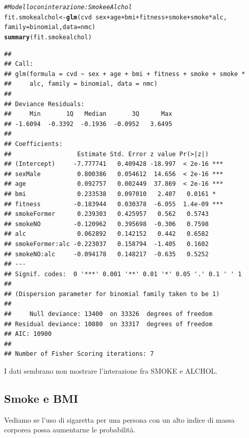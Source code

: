 \documentclass{article}\usepackage[]{graphicx}\usepackage[]{xcolor}
\makeatletter
\newcommand{\hlcom}[1]{\textcolor[rgb]{0.678,0.584,0.686}{\textit{#1}}}%
\newcommand{\hlopt}[1]{\textcolor[rgb]{0,0,0}{#1}}%
\newcommand{\hlstd}[1]{\textcolor[rgb]{0.345,0.345,0.345}{#1}}%
\newcommand{\hlkwb}[1]{\textcolor[rgb]{0.69,0.353,0.396}{#1}}%
\newcommand{\hlkwc}[1]{\textcolor[rgb]{0.333,0.667,0.333}{#1}}%
\newcommand{\hlkwd}[1]{\textcolor[rgb]{0.737,0.353,0.396}{\textbf{#1}}}%
\newenvironment{kframe}{%
 \def\at@end@of@kframe{}%
 \ifinner\ifhmode%
  \def\at@end@of@kframe{\end{minipage}}%
  \begin{minipage}{\columnwidth}%
 \fi\fi%
 \def\FrameCommand##1{\hskip\@totalleftmargin \hskip-\fboxsep
 \colorbox{shadecolor}{##1}\hskip-\fboxsep
     \hskip-\linewidth \hskip-\@totalleftmargin \hskip\columnwidth}%
 \MakeFramed {\advance\hsize-\width
   \@totalleftmargin\z@ \linewidth\hsize
   \@setminipage}}%
 {\par\unskip\endMakeFramed%
 \at@end@of@kframe}
\newenvironment{knitrout}{}{} %
\makeatother
\begin{document}
\begin{knitrout}
\color{fgcolor}\begin{kframe}
\begin{alltt}
\hlcom{#Modello con interazione: Smoke e Alchol}
\hlstd{fit.smokealchol} \hlkwb{<-} \hlkwd{glm}\hlstd{(cvd}\hlopt{~}\hlstd{sex}\hlopt{+}\hlstd{age}\hlopt{+}\hlstd{bmi}\hlopt{+}\hlstd{fitness}\hlopt{+}\hlstd{smoke}\hlopt{+}\hlstd{smoke}\hlopt{*}\hlstd{alc,}
                       \hlkwc{family}\hlstd{=binomial,} \hlkwc{data}\hlstd{=nmc)}
\hlkwd{summary}\hlstd{(fit.smokealchol)}
\end{alltt}
\begin{verbatim}
## 
## Call:
## glm(formula = cvd ~ sex + age + bmi + fitness + smoke + smoke * 
##     alc, family = binomial, data = nmc)
## 
## Deviance Residuals: 
##     Min       1Q   Median       3Q      Max  
## -1.6094  -0.3392  -0.1936  -0.0952   3.6495  
## 
## Coefficients:
##                  Estimate Std. Error z value Pr(>|z|)    
## (Intercept)     -7.777741   0.409428 -18.997  < 2e-16 ***
## sexMale          0.800386   0.054612  14.656  < 2e-16 ***
## age              0.092757   0.002449  37.869  < 2e-16 ***
## bmi              0.233538   0.097010   2.407   0.0161 *  
## fitness         -0.183944   0.030378  -6.055  1.4e-09 ***
## smokeFormer      0.239303   0.425957   0.562   0.5743    
## smokeNO         -0.120962   0.395698  -0.306   0.7598    
## alc              0.062892   0.142152   0.442   0.6582    
## smokeFormer:alc -0.223037   0.158794  -1.405   0.1602    
## smokeNO:alc     -0.094178   0.148217  -0.635   0.5252    
## ---
## Signif. codes:  0 '***' 0.001 '**' 0.01 '*' 0.05 '.' 0.1 ' ' 1
## 
## (Dispersion parameter for binomial family taken to be 1)
## 
##     Null deviance: 13400  on 33326  degrees of freedom
## Residual deviance: 10880  on 33317  degrees of freedom
## AIC: 10900
## 
## Number of Fisher Scoring iterations: 7
\end{verbatim}
\end{kframe}
\end{knitrout}
    
    I dati sembrano non mostrare l'interazione fra SMOKE e ALCHOL.
  
  \subsection{Smoke e BMI}
    Vediamo se l'uso di sigaretta per una persona con un alto indice di massa 
    corporea possa aumentarne le probabilità.
    
\end{document}
